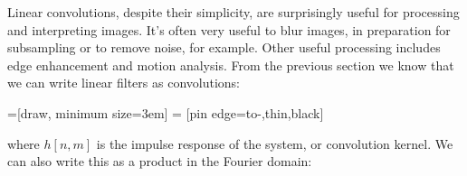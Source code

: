 Linear convolutions, despite their simplicity, are surprisingly useful for processing and interpreting images.  
It's often very useful to blur images, in preparation for subsampling or to remove noise, for example.  Other useful processing includes
edge enhancement and motion analysis. From the previous section we know that we can write linear filters as convolutions:
\begin{center}
=[draw, minimum size=3em]
 = [pin edge={to-,thin,black}]
\end{center}
where $h \left[n,m \right]$ is the impulse response of the system, or convolution kernel.
We can also write this as a product in the Fourier domain:


